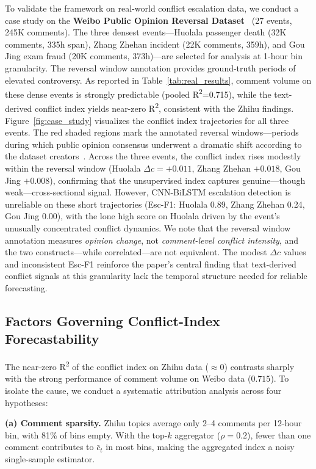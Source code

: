 \documentclass[journal]{IEEEtran}
\begin{document}
To validate the framework on real-world conflict escalation data, we conduct a case study on the \textbf{Weibo Public Opinion Reversal Dataset}~\cite{Zhang2023Reversal} (27 events, 245K comments). The three densest events---Huolala passenger death (32K comments, 335h span), Zhang Zhehan incident (22K comments, 359h), and Gou Jing exam fraud (20K comments, 373h)---are selected for analysis at 1-hour bin granularity. The reversal window annotation provides ground-truth periods of elevated controversy. As reported in Table~\ref{tab:real_results}, comment volume on these dense events is strongly predictable (pooled R\textsuperscript{2}=0.715), while the text-derived conflict index yields near-zero R\textsuperscript{2}, consistent with the Zhihu findings. Figure~\ref{fig:case_study} visualizes the conflict index trajectories for all three events. The red shaded regions mark the annotated reversal windows---periods during which public opinion consensus underwent a dramatic shift according to the dataset creators~\cite{Zhang2023Reversal}. Across the three events, the conflict index rises modestly within the reversal window (Huolala $\Delta c=+0.011$, Zhang Zhehan $+0.018$, Gou Jing $+0.008$), confirming that the unsupervised index captures genuine---though weak---cross-sectional signal. However, CNN-BiLSTM escalation detection is unreliable on these short trajectories (Esc-F1: Huolala 0.89, Zhang Zhehan 0.24, Gou Jing 0.00), with the lone high score on Huolala driven by the event's unusually concentrated conflict dynamics. We note that the reversal window annotation measures \emph{opinion change}, not \emph{comment-level conflict intensity}, and the two constructs---while correlated---are not equivalent. The modest $\Delta c$ values and inconsistent Esc-F1 reinforce the paper's central finding that text-derived conflict signals at this granularity lack the temporal structure needed for reliable forecasting.

\subsection{Factors Governing Conflict-Index Forecastability}\label{sec:discussion}\label{sec:attribution}

The near-zero R\textsuperscript{2} of the conflict index on Zhihu data ($\approx 0$) contrasts sharply with the strong performance of comment volume on Weibo data ($0.715$). To isolate the cause, we conduct a systematic attribution analysis across four hypotheses:

\textbf{(a) Comment sparsity.} Zhihu topics average only 2--4 comments per 12-hour bin, with 81\% of bins empty. With the top-$k$ aggregator ($\rho{=}0.2$), fewer than one comment contributes to $\bar{c}_t$ in most bins, making the aggregated index a noisy single-sample estimator.
\end{document}
